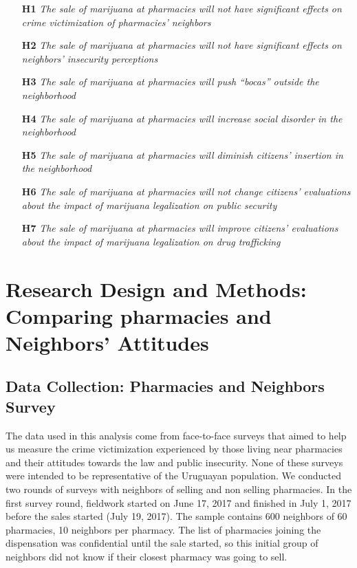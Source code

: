 \documentclass[11pt]{article}
\begin{document}
\begin{itemize}
\item [\textbf{H1}] \textit{The sale of marijuana at pharmacies will not have significant effects on crime victimization of pharmacies' neighbors}

\item [\textbf{H2}] \textit{The sale of marijuana at pharmacies will not have significant effects on neighbors' insecurity perceptions}

\item [\textbf{H3}] \textit{The sale of marijuana at pharmacies will push ``bocas'' outside the neighborhood}

\item [\textbf{H4}] \textit{The sale of marijuana at pharmacies will increase social disorder in the neighborhood}

\item [\textbf{H5}] \textit{The sale of marijuana at pharmacies will diminish citizens' insertion in the neighborhood}

\item [\textbf{H6}] \textit{The sale of marijuana at pharmacies will not change citizens' evaluations about the impact of marijuana legalization on public security}

\item [\textbf{H7}] \textit{The sale of marijuana at pharmacies will improve citizens' evaluations about the impact of marijuana legalization on drug trafficking}

\end{itemize}

\section{Research Design and Methods: Comparing pharmacies and Neighbors' Attitudes}
\subsection{Data Collection: Pharmacies and Neighbors Survey}
The data used in this analysis come from face-to-face surveys that aimed to help us measure the crime victimization experienced by those living near pharmacies and their attitudes towards the law and public insecurity. None of these surveys were intended to be representative of the Uruguayan population. We conducted two rounds of surveys with neighbors of selling and non selling pharmacies. In the first survey round, fieldwork started on June 17, 2017 and finished in July 1, 2017 before the sales started (July 19, 2017). The sample contains 600 neighbors of 60 pharmacies, 10 neighbors per pharmacy. The list of pharmacies joining the dispensation was confidential until the sale started, so this initial group of neighbors did not know if their closest pharmacy was going to sell. 
\end{document}
